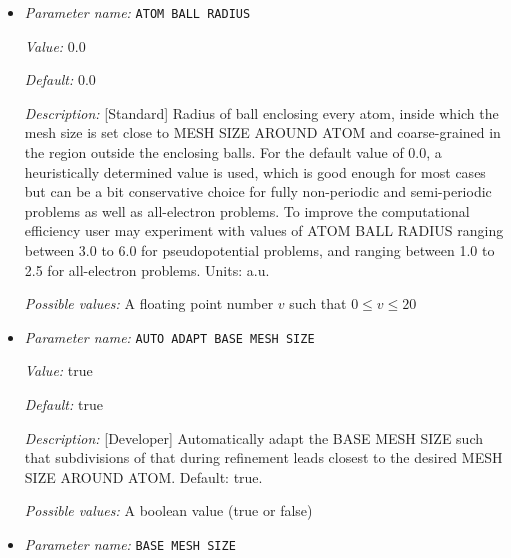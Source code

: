 \begin{itemize}
\item {\it Parameter name:} {\tt ATOM BALL RADIUS}
\label{parameters:Finite element mesh parameters/Auto mesh generation parameters/ATOM BALL RADIUS}
\label{parameters:Finite_20element_20mesh_20parameters/Auto_20mesh_20generation_20parameters/ATOM_20BALL_20RADIUS}


{\it Value:} 0.0


{\it Default:} 0.0


{\it Description:} [Standard] Radius of ball enclosing every atom, inside which the mesh size is set close to MESH SIZE AROUND ATOM and coarse-grained in the region outside the enclosing balls. For the default value of 0.0, a heuristically determined value is used, which is good enough for most cases but can be a bit conservative choice for fully non-periodic and semi-periodic problems as well as all-electron problems. To improve the computational efficiency user may experiment with values of ATOM BALL RADIUS ranging between 3.0 to 6.0 for pseudopotential problems, and ranging between 1.0 to 2.5 for all-electron problems.  Units: a.u.


{\it Possible values:} A floating point number $v$ such that $0 \leq v \leq 20$
\item {\it Parameter name:} {\tt AUTO ADAPT BASE MESH SIZE}
\label{parameters:Finite element mesh parameters/Auto mesh generation parameters/AUTO ADAPT BASE MESH SIZE}
\label{parameters:Finite_20element_20mesh_20parameters/Auto_20mesh_20generation_20parameters/AUTO_20ADAPT_20BASE_20MESH_20SIZE}


{\it Value:} true


{\it Default:} true


{\it Description:} [Developer] Automatically adapt the BASE MESH SIZE such that subdivisions of that during refinement leads closest to the desired MESH SIZE AROUND ATOM. Default: true.


{\it Possible values:} A boolean value (true or false)
\item {\it Parameter name:} {\tt BASE MESH SIZE}
\label{parameters:Finite element mesh parameters/Auto mesh generation parameters/BASE MESH SIZE}
\label{parameters:Finite_20element_20mesh_20parameters/Auto_20mesh_20generation_20parameters/BASE_20MESH_20SIZE}



\end{itemize}
